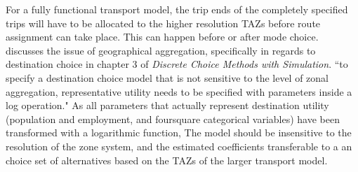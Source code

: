 For a fully functional transport model, the trip ends of the completely specified trips will have to be allocated to the higher resolution TAZs before route assignment can take place. This can happen before or after mode choice. \textcite{Train09} discusses the issue of geographical aggregation, specifically in regards to destination choice in chapter 3 of \textit{Discrete Choice Methods with Simulation}. 
``to specify a destination choice model that is not sensitive to the level of zonal aggregation, representative utility needs to be specified with parameters inside a log operation."
As all parameters that actually represent destination utility (population and employment, and foursquare categorical variables) have been transformed with a logarithmic function, The model should be insensitive to the resolution of the zone system, and the estimated coefficients transferable to a an choice set of alternatives based on the TAZs of the larger transport model.

